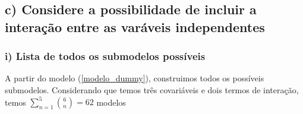 \documentclass[
  letterpaper,
  DIV=11,
  numbers=noendperiod]{scrartcl}
\begin{document}
\hypertarget{c-considere-a-possibilidade-de-incluir-a-interauxe7uxe3o-entre-as-varuxe1veis-independentes}{%
\subsection{c) Considere a possibilidade de incluir a interação entre as
varáveis
independentes}\label{c-considere-a-possibilidade-de-incluir-a-interauxe7uxe3o-entre-as-varuxe1veis-independentes}}

\hypertarget{i-lista-de-todos-os-submodelos-possuxedveis}{%
\subsubsection{i) Lista de todos os submodelos
possíveis}\label{i-lista-de-todos-os-submodelos-possuxedveis}}

A partir do modelo (\ref{modelo_dummy}), construimos todos os possíveis
submodelos. Considerando que temos três covariáveis e dois termos de
interação, temos \(\sum\limits_{n = 1}^5\binom{6}{n} = 62\) modelos
\end{document}
